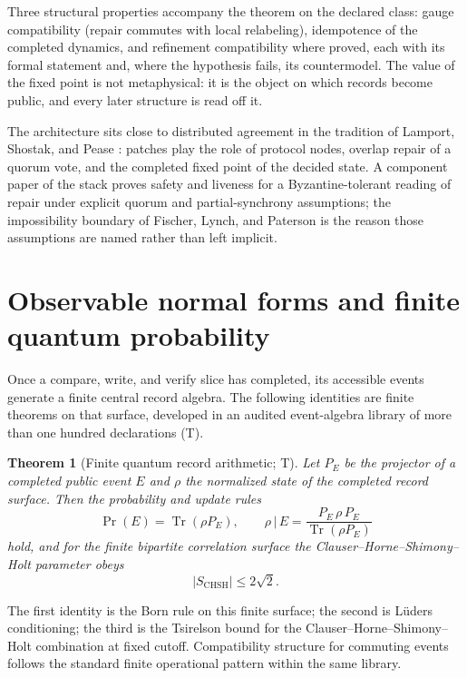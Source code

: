 \documentclass[11pt]{article}
\newtheorem{theorem}{Theorem}[section]
\theoremstyle{remark}
\newcommand{\evT}{\textsf{T}}   %
\begin{document}
Three structural properties accompany the theorem on the declared class:
gauge compatibility (repair commutes with local relabeling), idempotence of
the completed dynamics, and refinement compatibility where proved, each with
its formal statement and, where the hypothesis fails, its countermodel. The
value of the fixed point is not metaphysical: it is the object on which
records become public, and every later structure is read off it.

The architecture sits close to distributed agreement in the tradition of
Lamport, Shostak, and Pease \cite{lamport1982}: patches play the role of
protocol nodes, overlap repair of a quorum vote, and the completed fixed
point of the decided state. A component paper of the stack proves safety and
liveness for a Byzantine-tolerant reading of repair under explicit quorum
and partial-synchrony assumptions; the impossibility boundary of Fischer,
Lynch, and Paterson \cite{flp1985} is the reason those assumptions are named
rather than left implicit.

\section{Observable normal forms and finite quantum probability}
\label{sec:quantum}

Once a compare, write, and verify slice has completed, its accessible events
generate a finite central record algebra. The following identities are
finite theorems on that surface, developed in an audited event-algebra
library of more than one hundred declarations (\evT).

\begin{theorem}[Finite quantum record arithmetic; \evT]
\label{thm:born}
Let $P_E$ be the projector of a completed public event $E$ and $\rho$ the
normalized state of the completed record surface. Then the probability and
update rules
\begin{equation}
\Pr(E)=\operatorname{Tr}(\rho P_E),
\qquad
\rho\,|\,E=\frac{P_E\,\rho\,P_E}{\operatorname{Tr}(\rho P_E)}
\end{equation}
hold, and for the finite bipartite correlation surface the
Clauser--Horne--Shimony--Holt parameter obeys
\begin{equation}
|S_{\mathrm{CHSH}}|\le 2\sqrt 2 .
\end{equation}
\end{theorem}

The first identity is the Born rule on this finite surface; the second is
L\"uders conditioning; the third is the Tsirelson bound \cite{tsirelson1980}
for the Clauser--Horne--Shimony--Holt combination \cite{chsh1969} at fixed
cutoff.
Compatibility structure for commuting events follows the standard finite
operational pattern within the same library.
\end{document}

